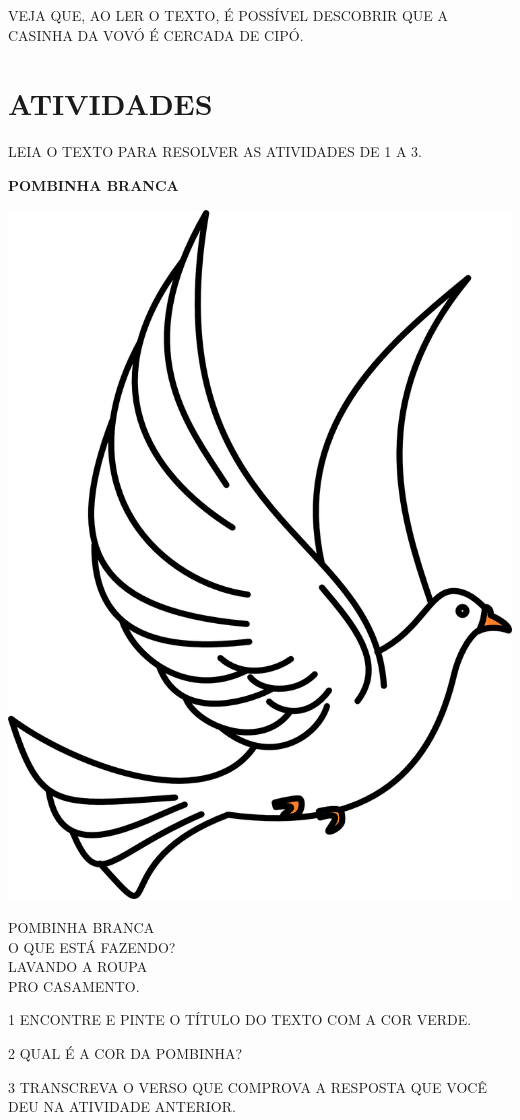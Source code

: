 {VEJA QUE, AO LER O TEXTO, É POSSÍVEL DESCOBRIR QUE A CASINHA DA VOVÓ É CERCADA DE CIPÓ.

}

\section*{ATIVIDADES}



LEIA O TEXTO PARA RESOLVER AS ATIVIDADES DE 1 A 3.

\begin{myquote}
\centering
\textbf{POMBINHA BRANCA}\\

\vspace{0.5cm}

\includegraphics[width=.3\textwidth]{media/image126.png}

\vspace{0.5cm}

POMBINHA BRANCA\\
O QUE ESTÁ FAZENDO?\\
LAVANDO A ROUPA\\
PRO CASAMENTO.

\end{myquote}

\num{1} ENCONTRE E PINTE O TÍTULO DO TEXTO COM A COR VERDE. 

\num{2} QUAL É A COR DA POMBINHA?


\num{3} TRANSCREVA O VERSO QUE COMPROVA A RESPOSTA QUE VOCÊ DEU NA ATIVIDADE ANTERIOR.


